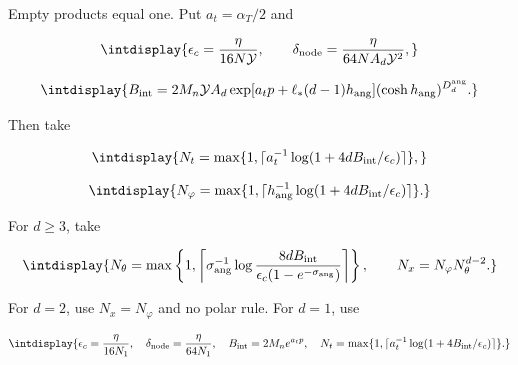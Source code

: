 
Empty products equal one. Put \(a_t=\alpha_T/2\) and


\begingroup\renewcommand{\theHequation}{intdisplay.245}
\begin{equation*}
\intdisplay{
\epsilon_c=\frac{\eta}{16N\mathcal Y},\qquad
\delta_{\rm node}=\frac{\eta}{64NA_d\mathcal Y^2},
}
\end{equation*}
\endgroup

\begingroup\renewcommand{\theHequation}{intdisplay.246}
\begin{equation*}
\intdisplay{
B_{\rm int}=2M_n\mathcal YA_d
 \exp[a_tp+\ell_*(d-1)h_{\rm ang}]
                    (\cosh h_{\rm ang})^{D_d^{\rm ang}}.
}
\end{equation*}
\endgroup


Then take


\begingroup\renewcommand{\theHequation}{intdisplay.247}
\begin{equation*}
\intdisplay{
N_t=\max\{1,\lceil a_t^{-1}\log(1+4dB_{\rm int}/\epsilon_c)\rceil\},
}
\end{equation*}
\endgroup

\begingroup\renewcommand{\theHequation}{intdisplay.248}
\begin{equation*}
\intdisplay{
N_\varphi=\max\{1,\lceil h_{\rm ang}^{-1}
                              \log(1+4dB_{\rm int}/\epsilon_c)\rceil\}.
}
\end{equation*}
\endgroup


For \(d\ge3\), take


\begingroup\renewcommand{\theHequation}{intdisplay.249}
\begin{equation*}
\intdisplay{
N_\theta=\max\left\{1,\left\lceil\sigma_{\rm ang}^{-1}
\log\frac{8dB_{\rm int}}{\epsilon_c(1-e^{-\sigma_{\rm ang}})}
\right\rceil\right\},\qquad N_x=N_\varphi N_\theta^{d-2}.
}
\end{equation*}
\endgroup


For \(d=2\), use \(N_x=N_\varphi\) and no polar rule. For \(d=1\), use


\begingroup\renewcommand{\theHequation}{intdisplay.250}
\begin{equation*}
\intdisplay{
\epsilon_c=\frac{\eta}{16N_1},\quad
\delta_{\rm node}=\frac{\eta}{64N_1},\quad
B_{\rm int}=2M_ne^{a_tp},\quad
N_t=\max\{1,\lceil a_t^{-1}\log(1+4B_{\rm int}/\epsilon_c)\rceil\}.
}
\end{equation*}
\endgroup

